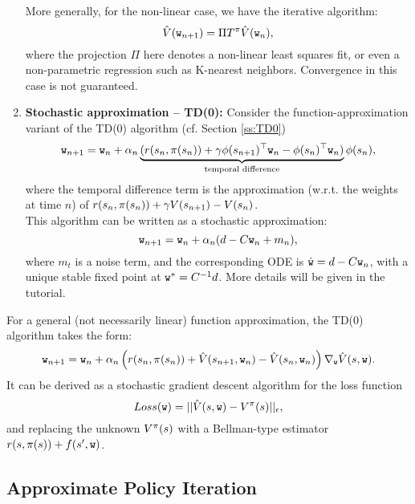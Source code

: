 \begin{enumerate}
More generally, for the non-linear case, we have the iterative algorithm:
$$\hat{V}(\texttt{w}_{n+1}) = \Pi T^\pi \hat{V}(\texttt{w}_{n}),$$
where the projection $\Pi$ here denotes a non-linear least squares fit, or even a non-parametric regression such as K-nearest neighbors. Convergence in this case is not guaranteed.

\item \textbf{Stochastic approximation -- TD(0):} Consider the function-approximation variant of the TD(0) algorithm (cf. Section \ref{ss:TD0})
\begin{equation*}
    \texttt{w}_{n+1} = \texttt{w}_n + \alpha_n \underbrace{( r(s_n,\pi(s_n)) +\gamma {\phi}(s_{n+1})^\top \texttt{w}_n - {\phi}(s_{n})^\top \texttt{w}_n)}_{\textrm{temporal difference}} \phi(s_{n}),
\end{equation*}
where the temporal difference term is the approximation (w.r.t. the weights at time $n$) of $r(s_n,\pi(s_n)) +\gamma V(s_{n+1}) - V(s_n)$.
\\
This algorithm can be written as a stochastic approximation:
\begin{equation*}
    \texttt{w}_{n+1} = \texttt{w}_n + \alpha_n ( d -  C \texttt{w}_n + m_n ),
\end{equation*}
where $m_t$ is a noise term, and the corresponding ODE is $\dot{\texttt{w}} = d -  C \texttt{w}_n$, with a unique stable fixed point at $\texttt{w}^* = C^{-1}d$. More details will be given in the tutorial.
\end{enumerate}
For a general (not necessarily linear) function approximation, the TD(0) algorithm takes the form:
\begin{equation*}
    \texttt{w}_{n+1} = \texttt{w}_n + \alpha_n \left( r(s_n,\pi(s_n)) + \hat{V}(s_{n+1},\texttt{w}_n) - \hat{V}(s_{n},\texttt{w}_n) \right) \nabla_{\texttt{w}} \hat{V}(s,\texttt{w}).
\end{equation*}
It can be derived as a stochastic gradient descent algorithm for the loss function
\begin{equation*}
    Loss(\texttt{w}) = ||\hat{V}(s,\texttt{w}) - V^\pi(s)||_\epsilon,
\end{equation*}
and replacing the unknown $V^\pi(s)$ with a Bellman-type estimator $r(s,\pi(s))+f(s',\texttt{w})$.
%

\subsection{Approximate Policy Iteration}

